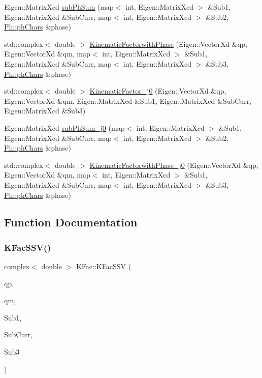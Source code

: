 \begin{DoxyCompactItemize}
\item 
Eigen\+::\+Matrix\+Xcd \mbox{\hyperlink{namespaceKFac_a87e82af0cfc26fdde23953fb315dc9d5}{sub\+Ph\+Sum}} (map$<$ int, Eigen\+::\+Matrix\+Xcd $>$ \&Sub1, Eigen\+::\+Matrix\+Xcd \&Sub\+Curr, map$<$ int, Eigen\+::\+Matrix\+Xcd $>$ \&Sub2, \mbox{\hyperlink{structPh_1_1phChars}{Ph\+::ph\+Chars}} \&phase)
\item 
std\+::complex$<$ double $>$ \mbox{\hyperlink{namespaceKFac_a5fe5ea6a5ab8c5c87ca764f254396434}{Kinematic\+Factorwith\+Phase}} (Eigen\+::\+Vector\+Xd \&qp, Eigen\+::\+Vector\+Xd \&qm, map$<$ int, Eigen\+::\+Matrix\+Xcd $>$ \&Sub1, Eigen\+::\+Matrix\+Xcd \&Sub\+Curr, map$<$ int, Eigen\+::\+Matrix\+Xcd $>$ \&Sub3, \mbox{\hyperlink{structPh_1_1phChars}{Ph\+::ph\+Chars}} \&phase)
\item 
std\+::complex$<$ double $>$ \mbox{\hyperlink{namespaceKFac_a6f8f443ade2532c958e4dc168d7da1c7}{Kinematic\+Factor\+\_\+j0}} (Eigen\+::\+Vector\+Xd \&qp, Eigen\+::\+Vector\+Xd \&qm, Eigen\+::\+Matrix\+Xcd \&Sub1, Eigen\+::\+Matrix\+Xcd \&Sub\+Curr, Eigen\+::\+Matrix\+Xcd \&Sub3)
\item 
Eigen\+::\+Matrix\+Xcd \mbox{\hyperlink{namespaceKFac_abb86856b8424632f8f879408ce2cc05b}{sub\+Ph\+Sum\+\_\+j0}} (map$<$ int, Eigen\+::\+Matrix\+Xcd $>$ \&Sub1, Eigen\+::\+Matrix\+Xcd \&Sub\+Curr, map$<$ int, Eigen\+::\+Matrix\+Xcd $>$ \&Sub2, \mbox{\hyperlink{structPh_1_1phChars}{Ph\+::ph\+Chars}} \&phase)
\item 
std\+::complex$<$ double $>$ \mbox{\hyperlink{namespaceKFac_a8a20f176fbf91758f8699734b8df3f04}{Kinematic\+Factorwith\+Phase\+\_\+j0}} (Eigen\+::\+Vector\+Xd \&qp, Eigen\+::\+Vector\+Xd \&qm, map$<$ int, Eigen\+::\+Matrix\+Xcd $>$ \&Sub1, Eigen\+::\+Matrix\+Xcd \&Sub\+Curr, map$<$ int, Eigen\+::\+Matrix\+Xcd $>$ \&Sub3, \mbox{\hyperlink{structPh_1_1phChars}{Ph\+::ph\+Chars}} \&phase)
\end{DoxyCompactItemize}


\subsection{Function Documentation}
\mbox{\label{namespaceKFac_a3fc08fc4d40cb022d9e68ea0e9e39044}} 
\subsubsection{\texorpdfstring{KFacSSV()}{KFacSSV()}}
{\footnotesize\ttfamily complex$<$ double $>$ K\+Fac\+::\+K\+Fac\+S\+SV (\begin{DoxyParamCaption}\item[{Eigen\+::\+Vector\+Xd \&}]{qp,  }\item[{Eigen\+::\+Vector\+Xd \&}]{qm,  }\item[{Eigen\+::\+Matrix\+Xcd \&}]{Sub1,  }\item[{Eigen\+::\+Matrix\+Xcd \&}]{Sub\+Curr,  }\item[{Eigen\+::\+Matrix\+Xcd \&}]{Sub3 }\end{DoxyParamCaption})}

